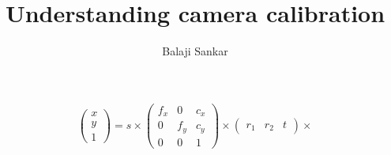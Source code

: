 \documentclass[14pt]{article}
\title{Understanding camera calibration}
\author{  Balaji Sankar    }
\begin{document}
\maketitle
\[
\left( \begin{array}{c}
x \\
y \\
1 \end{array} \right)  = s \times
 \left( \begin{array}{ccc}
f_x & 0 & c_x \\
0 & f_y & c_y \\
0 & 0 & 1 \end{array} \right) \times
\left( \begin{array}{ccc}
r_1 & r_2 & t \end{array} \right) \times
\] 
\end{document}

